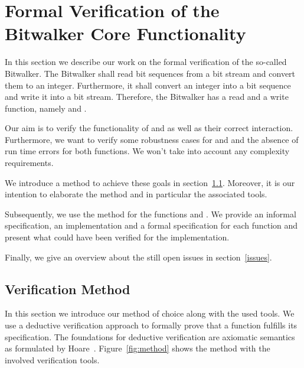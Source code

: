 
\section{Formal Verification of the Bitwalker Core Functionality}
\label{sec:formal-verification}


In this section we describe our work on the formal verification
of the so-called Bitwalker.
The Bitwalker shall read bit sequences from a bit stream 
and convert them to an integer. Furthermore, it shall
convert an integer into a bit sequence and write it into a bit stream.
Therefore, the Bitwalker has a read and a write function, namely \peek and \poke.

Our aim is to verify the functionality of
\peek and \poke
as well as their correct interaction.
Furthermore, we want to verify some robustness cases for \peek and \poke
and the absence of run time errors for both functions.
We won't take into account any complexity requirements.

We introduce a method to achieve these goals in section~\ref{plan}.
Moreover, it is our intention
to elaborate the method and in particular the associated tools.

Subsequently, we use the method for the functions \peek and \poke.
We provide an informal specification, an implementation and
a formal specification for each function and
present what could have been verified for the implementation.

Finally, we give an overview about the still open issues in section~\ref{issues}.


\clearpage

\subsection{Verification Method}
\label{plan}
\label{method}

In this section we introduce our method of choice along with the used tools.
We use a deductive verification approach to 
formally prove that a function fulfills its specification.
The foundations for deductive verification are axiomatic semantics as formulated
by Hoare~\cite{HoareCalculus}.
Figure~\ref{fig:method} shows the method with the involved verification tools.

